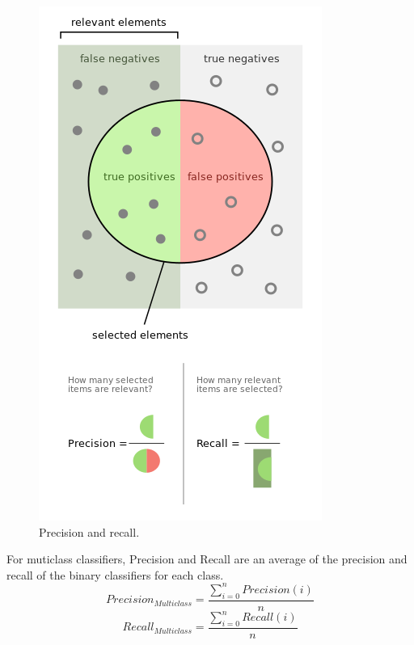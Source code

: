 \begin{figure}[!h]
\centering
\includegraphics[width=.5\textwidth]{Images/prec_rec.png}
\caption{Precision and recall.}
\label{fig:prec_rec}
\end{figure}


For muticlass classifiers, Precision and Recall are an average of the precision and recall of the binary classifiers for each class.
\begin{equation*}
Precision_{Multiclass} = \frac{\sum_{i=0}^{n} Precision(i)}{n} 
\end{equation*}
\begin{equation*}
Recall_{Multiclass} = \frac{\sum_{i=0}^{n} Recall(i)}{n} 
\end{equation*}
